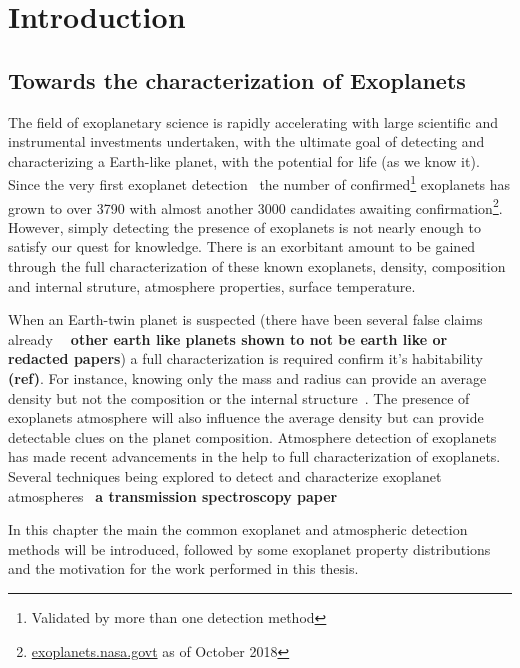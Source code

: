 \chapter{Introduction}\label{cha:introduction}


\section{Towards the characterization of Exoplanets}

The field of exoplanetary science is rapidly accelerating with large scientific and instrumental investments undertaken, with the ultimate goal of detecting and characterizing a Earth-like planet, with the potential for life (as we know it).
Since the very first exoplanet detection~\citet{mayor_jupitermass_1995} the number of confirmed\footnote{Validated by more than one detection method} exoplanets has grown to over 3790 with almost another 3000 candidates awaiting confirmation\footnote{\href{https://exoplanets.nasa.gov/}{exoplanets.nasa.govt} as of October 2018}.
However, simply detecting the presence of exoplanets is not nearly enough to satisfy our quest for knowledge.
There is an exorbitant amount to be gained through the full characterization of these known exoplanets, density, composition and internal struture, atmosphere properties, surface temperature.

When an Earth-twin planet is suspected (there have been several false claims already \textbf{~\citep[e.g.][]{mullally_kepler_2018, more} other earth like planets shown to not be earth like or redacted papers}) a full characterization is required confirm it's habitability \textbf{(ref)}.
For instance, knowing only the mass and radius can provide an average density but not the composition or the internal structure~\citet{a paper about composition degeneracy}.
The presence of exoplanets atmosphere will also influence the average density but can provide detectable clues on the planet composition.
Atmosphere detection of exoplanets has made recent advancements in the help to full characterization of exoplanets.
Several techniques being explored to detect and characterize exoplanet atmospheres~\citep[e.g.][]{martins_reflected_2015, piskorz_evidence_2016 , snellen_orbital_2010} \textbf{a transmission spectroscopy paper}

In this chapter the main the common exoplanet and atmospheric detection methods will be introduced, followed by some exoplanet property distributions and the motivation for the work performed in this thesis.\\


